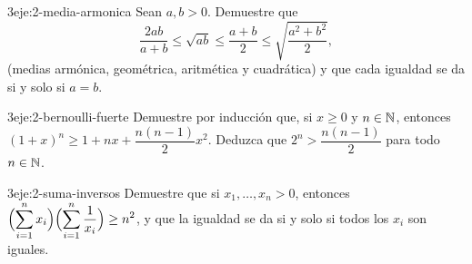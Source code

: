\begin{ejercicio}{3}{eje:2-media-armonica}
Sean $a,b>0$. Demuestre que
\[
\frac{2ab}{a+b}\le\sqrt{ab}\le\frac{a+b}{2}\le\sqrt{\frac{a^2+b^2}{2}},
\]
(medias armónica, geométrica, aritmética y cuadrática) y que cada igualdad se da si y solo si $a=b$.
\end{ejercicio}

\begin{ejercicio}{3}{eje:2-bernoulli-fuerte}
Demuestre por inducción que, si $x\ge0$ y $n\in\mathbb{N}$, entonces $(1+x)^n\ge1+nx+\dfrac{n(n-1)}{2}x^2$. Deduzca que $2^n>\dfrac{n(n-1)}2$ para todo $n\in\mathbb{N}$.
\end{ejercicio}

\begin{ejercicio}{3}{eje:2-suma-inversos}
Demuestre que si $x_1,\dots,x_n>0$, entonces $\displaystyle\Bigl(\sum_{i=1}^nx_i\Bigr)\Bigl(\sum_{i=1}^n\frac1{x_i}\Bigr)\ge n^2$, y que la igualdad se da si y solo si todos los $x_i$ son iguales.
\end{ejercicio}
